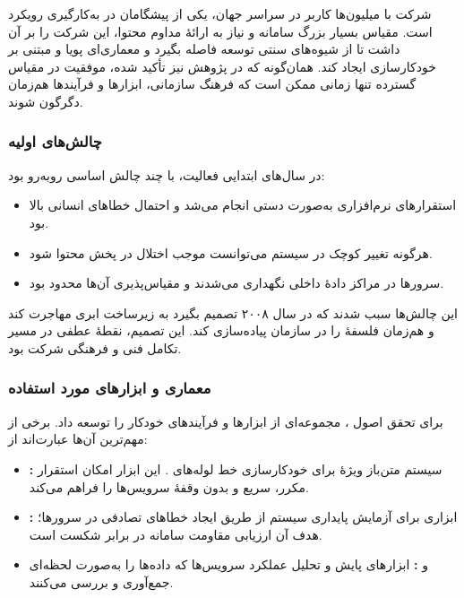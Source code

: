 
شرکت  با میلیون‌ها کاربر در سراسر جهان، یکی از پیشگامان در به‌کارگیری رویکرد  است. مقیاس بسیار بزرگ سامانه و نیاز به ارائهٔ مداوم محتوا، این شرکت را بر آن داشت تا از شیوه‌های سنتی توسعه فاصله بگیرد و معماری‌ای پویا و مبتنی بر خودکارسازی ایجاد کند. همان‌گونه که در پژوهش \cite{Jha2023} نیز تأکید شده، موفقیت در مقیاس گسترده تنها زمانی ممکن است که فرهنگ سازمانی، ابزارها و فرآیندها هم‌زمان دگرگون شوند.

\subsubsection*{چالش‌های اولیه}

در سال‌های ابتدایی فعالیت،  با چند چالش اساسی روبه‌رو بود:
\begin{itemize}
    \item استقرارهای نرم‌افزاری به‌صورت دستی انجام می‌شد و احتمال خطاهای انسانی بالا بود.
    \item هرگونه تغییر کوچک در سیستم می‌توانست موجب اختلال در پخش محتوا شود.
    \item سرورها در مراکز دادهٔ داخلی نگهداری می‌شدند و مقیاس‌پذیری آن‌ها محدود بود.
\end{itemize}

این چالش‌ها سبب شدند که  در سال ۲۰۰۸ تصمیم بگیرد به زیرساخت ابری مهاجرت کند و هم‌زمان فلسفهٔ  را در سازمان پیاده‌سازی کند. این تصمیم، نقطهٔ عطفی در مسیر تکامل فنی و فرهنگی شرکت بود.

\subsubsection*{معماری و ابزارهای مورد استفاده}

برای تحقق اصول ،  مجموعه‌ای از ابزارها و فرآیندهای خودکار را توسعه داد. برخی از مهم‌ترین آن‌ها عبارت‌اند از:
\begin{itemize}
    \item \textbf{:} سیستم متن‌باز ویژهٔ  برای خودکارسازی خط لوله‌های . این ابزار امکان استقرار مکرر، سریع و بدون وقفهٔ سرویس‌ها را فراهم می‌کند.
    \item \textbf{:} ابزاری برای آزمایش پایداری سیستم از طریق ایجاد خطاهای تصادفی در سرورها؛ هدف آن ارزیابی مقاومت سامانه در برابر شکست است.
    \item \textbf{} و \textbf{:} ابزارهای پایش و تحلیل عملکرد سرویس‌ها که داده‌ها را به‌صورت لحظه‌ای جمع‌آوری و بررسی می‌کنند.
\end{itemize}

